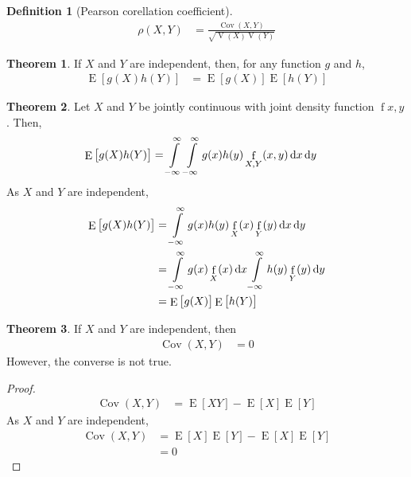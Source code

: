 \documentclass[titlepage, fleqn, a4paper, 12pt, twoside]{article}
\theoremstyle{definition}
\newtheorem{definition}{Definition}
\theoremstyle{theorem}
\newtheorem{theorem}{Theorem}
\DeclareMathOperator{\expct}{\mathrm{E}}
\DeclareMathOperator{\var}{\mathrm{V}}
\DeclareMathOperator{\cov}{\mathrm{Cov}}
\DeclareMathOperator{\pdf}{\mathrm{f}}
\begin{document}
\begin{definition}[Pearson corellation coefficient]
	\begin{align*}
		\rho(X,Y) & = \frac{\cov(X,Y)}{\sqrt{\var(X) \var(Y)}}
	\end{align*}
\end{definition}

\begin{theorem}
	If $X$ and $Y$ are independent, then, for any function $g$ and $h$,
	\begin{align*}
		\expct\left[ g(X) h(Y) \right] & = \expct\left[ g(X) \right] \expct\left[ h(Y) \right]
	\end{align*}
\end{theorem}

\begin{theorem}
	Let $X$ and $Y$ be jointly continuous with joint density function $\pdf{x,y}$.
	Then,
	\begin{align*}
		\expct\left[ g(X) h(Y) \right] & = \int\limits_{-\infty}^{\infty} \int\limits_{-\infty}^{\infty} g(x) h(y) \pdf_{X,Y}(x,y) \dif x \dif y
	\end{align*}
	As $X$ and $Y$ are independent,
	\begin{align*}
		\expct\left[ g(X) h(Y) \right] & = \int\limits_{-\infty}^{\infty} g(x) h(y) \pdf_X(x) \pdf_Y(y) \dif x \dif y                                \\
                                               & = \int\limits_{-\infty}^{\infty} g(x) \pdf_X(x) \dif x \int\limits_{-\infty}^{\infty} h(y) \pdf_Y(y) \dif y \\
                                               & = \expct\left[ g(X) \right] \expct\left[ h(Y) \right]
	\end{align*}
\end{theorem}

\begin{theorem}
	If $X$ and $Y$ are independent, then
	\begin{align*}
		\cov(X,Y) & = 0
	\end{align*}
	However, the converse is not true.
\end{theorem}

\begin{proof}
	\begin{align*}
		\cov(X,Y) & = \expct[X Y] - \expct[X] \expct[Y]
	\end{align*}
	As $X$ and $Y$ are independent,
	\begin{align*}
		\cov(X,Y) & = \expct[X] \expct[Y] - \expct[X] \expct[Y] \\
                          & = 0
	\end{align*}
\end{proof}
\end{document}
